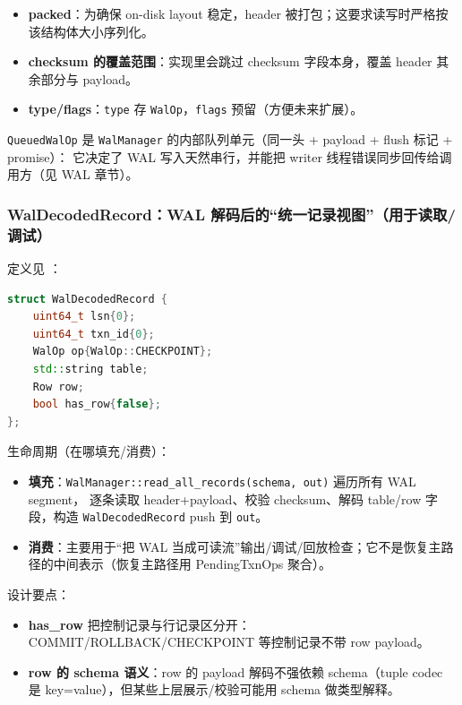 \begin{itemize}
  \item \textbf{packed}：为确保 on-disk layout 稳定，header 被打包；这要求读写时严格按该结构体大小序列化。
  \item \textbf{checksum 的覆盖范围}：实现里会跳过 checksum 字段本身，覆盖 header 其余部分与 payload。
  \item \textbf{type/flags}：\texttt{type} 存 \texttt{WalOp}，\texttt{flags} 预留（方便未来扩展）。
\end{itemize}

\texttt{QueuedWalOp} 是 \texttt{WalManager} 的内部队列单元（同一头 + payload + flush 标记 + promise）：
它决定了 WAL 写入天然串行，并能把 writer 线程错误同步回传给调用方（见 WAL 章节）。

\subsubsection{WalDecodedRecord：WAL 解码后的“统一记录视图”（用于读取/调试）}

定义见 ：

\begin{lstlisting}[language=C++,caption={WalDecodedRecord（原型）}]
struct WalDecodedRecord {
    uint64_t lsn{0};
    uint64_t txn_id{0};
    WalOp op{WalOp::CHECKPOINT};
    std::string table;
    Row row;
    bool has_row{false};
};
\end{lstlisting}

生命周期（在哪填充/消费）：

\begin{itemize}
  \item \textbf{填充}：\texttt{WalManager::read\_all\_records(schema, out)} 遍历所有 WAL segment，
    逐条读取 header+payload、校验 checksum、解码 table/row 字段，构造 \texttt{WalDecodedRecord} push 到 \texttt{out}。
  \item \textbf{消费}：主要用于“把 WAL 当成可读流”输出/调试/回放检查；它不是恢复主路径的中间表示（恢复主路径用 PendingTxnOps 聚合）。
\end{itemize}

设计要点：

\begin{itemize}
  \item \textbf{has\_row} 把控制记录与行记录区分开：COMMIT/ROLLBACK/CHECKPOINT 等控制记录不带 row payload。
  \item \textbf{row 的 schema 语义}：row 的 payload 解码不强依赖 schema（tuple codec 是 key=value），但某些上层展示/校验可能用 schema 做类型解释。
\end{itemize}

